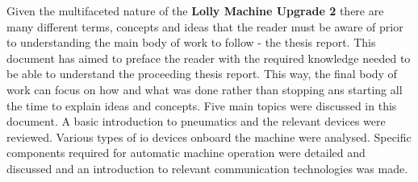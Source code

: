 Given the multifaceted nature of the \textbf{Lolly Machine Upgrade 2} there are many different terms, concepts and ideas that the reader must be aware of prior to understanding the main body of work to follow - the thesis report. This document has aimed to preface the reader with the required knowledge needed to be able to understand the proceeding thesis report. This way, the final body of work can focus on how and what was done rather than stopping ans starting all the time to explain ideas and concepts. Five main topics were discussed in this document. A basic introduction to pneumatics and the relevant devices were reviewed. Various types of \acrshort{io} devices onboard the machine were analysed. Specific components required for automatic machine operation were detailed and discussed and an introduction to relevant communication technologies was made. 